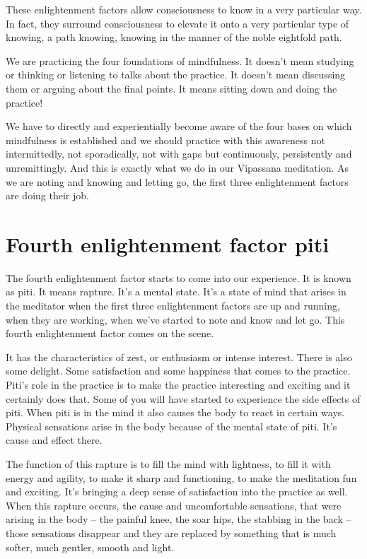 \documentclass[letterpaper,10pt,english]{sphinxmanual}
\begin{document}
\sphinxAtStartPar
These  enlightenment  factors  allow  consciousness  to  know  in  a  very
particular way. In fact, they surround consciousness to elevate it onto a very
particular type of knowing, a path knowing, knowing in the manner of the
noble eightfold path.

\sphinxAtStartPar
We are practicing the four foundations of mindfulness. It doesn’t mean
studying or thinking or listening to talks about the practice. It doesn’t mean
discussing them or arguing about the final points. It means sitting down and
doing the practice!

\sphinxAtStartPar
We have to directly and experientially become aware of the four bases
on which mindfulness is established and we should practice with this awareness not intermittedly, not sporadically, not with gaps but continuously, persistently and unremittingly. And this is exactly what we do in our Vipassana
meditation.  As  we  are  noting  and  knowing  and  letting  go,  the  first  three
enlightenment factors are doing their job.


\section{Fourth enlightenment factor piti}
\label{\detokenize{6-a:fourth-enlightenment-factor-piti}}
\sphinxAtStartPar
{} The fourth enlightenment factor starts to come into our experience. It
is known as piti. It means rapture. It’s a mental state. It’s a state of mind that
arises in the meditator when the first three enlightenment factors are up and
running, when they are working, when we’ve started to note and know and
let go. This fourth enlightenment factor comes on the scene.

\sphinxAtStartPar
It has the characteristics of zest, or enthusiasm or intense interest. There
is also some delight. Some satisfaction and some happiness that comes to the
practice.  Piti’s  role  in  the  practice  is  to  make  the  practice  interesting  and
exciting and it certainly does that. Some of you will have started to experience the side effects of piti. When piti is in the mind it also causes the body
to react in certain ways. Physical sensations arise in the body because of the
mental state of piti. It’s cause and effect there.

\sphinxAtStartPar
The  function  of  this  rapture  is  to  fill  the  mind  with  lightness,  to  fill
it  with  energy  and  agility,  to  make  it  sharp  and  functioning,  to  make  the
meditation fun and exciting. It’s bringing a deep sense of satisfaction into
the practice as well. When this rapture occurs, the cause and uncomfortable
sensations, that were arising in the body – the painful knee, the soar hips, the
stabbing in the back – those sensations disappear and they are replaced by
something that is much softer, much gentler, smooth and light.
\end{document}
